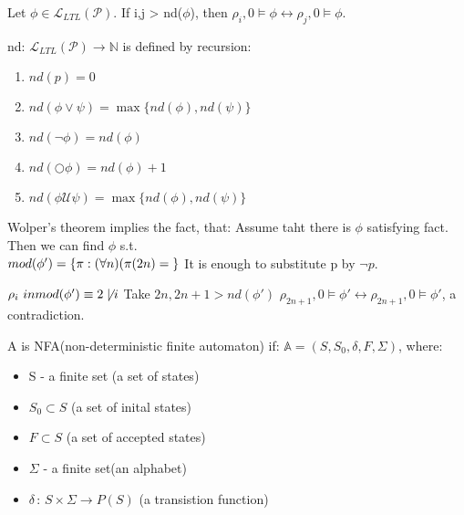 Let $\phi  \in \mathcal{L}_{LTL}(\mathcal{P})$. If i,j > nd($\phi $), then
$\rho_i, 0 \vDash \phi \leftrightarrow \rho_j, 0 \vDash \phi $.
\nt
{
    nd: $\mathcal{L}_{LTL}(\mathcal{P}) \rightarrow \mathbb{N}$ is defined by recursion:
    \begin{enumerate}
        \item $nd(p) = 0$
        \item $nd(\phi \vee \psi ) = \max\{nd(\phi ),nd(\psi )\}$
        \item $nd(\neg \phi ) = nd(\phi)$
        \item $nd(\Circle \phi ) = nd(\phi ) + 1$
        \item $nd(\phi \mathcal{U} \psi ) = \max\{nd(\phi ),nd(\psi )\}$

    \end{enumerate}
}

\nt
{
    Wolper's theorem implies the fact, that:
    Assume taht there is $\phi $ satisfying fact.
    Then we can find $\phi $ s.t. \\
    $mod(\phi ') = \{ \pi : (\forall n)(\pi (2n) = \null  \}$ 
    It is enough to substitute p by $\neg p$.

    {
        $\rho_i \ in mod(\phi ') \equiv 2 \not \mid i$
        Take $2n, 2n+1 > nd(\phi ')$
        $\rho_{2n+1}, 0 \vDash \phi ' \leftrightarrow \rho_{2n+1}, 0 \vDash \phi '$, a contradiction.
    }
}


{
    A is NFA(non-deterministic finite automaton) if: $\mathbb{A} = (S,S_0,\delta,F,\Sigma)$, where:
    \begin{itemize}
            \item S - a finite set (a set of states)
            \item $S_0 \subset S$ (a set of inital states)
            \item $F \subset S$ (a set of accepted states)
           \item $\Sigma$ - a finite set(an alphabet)
            \item  $\delta\,:\,S\times\Sigma \longrightarrow P(S)  $ (a transistion function)

            
    \end{itemize}
}

